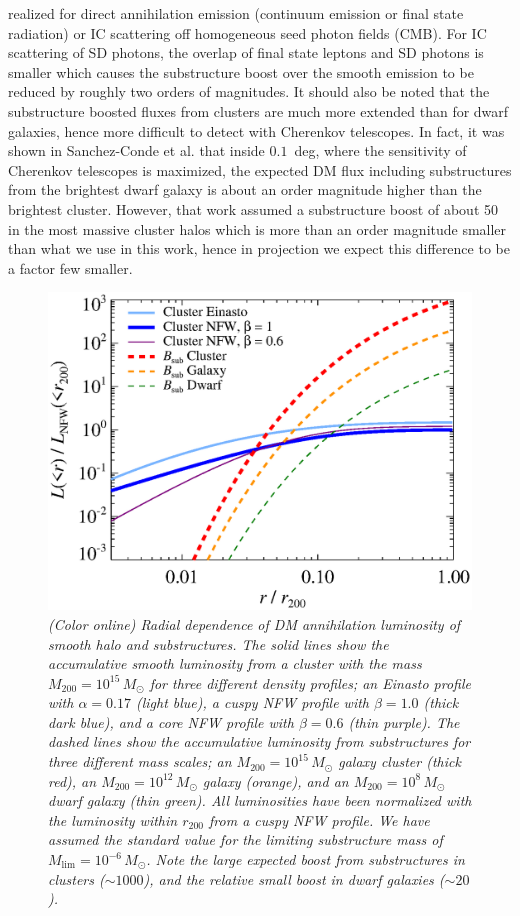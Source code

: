 \documentclass[10pt,aps,pra,reprint,amsmath,amsfonts,amssymb,showpacs,nofootinbib,floatfix]{revtex4-1}
\newcommand{\rmn}{\mathrm}
\newcommand{\msun}{M_\odot}
\newcommand{\rvir}{r_{200}}
\newcommand{\mvir}{M_{200}}
\begin{document}
realized for direct annihilation emission (continuum emission or final
state radiation) or IC scattering off homogeneous seed photon fields
(CMB). For IC scattering of SD photons, the overlap of final state
leptons and SD photons is smaller which causes the substructure boost
over the smooth emission to be reduced by roughly two orders of
magnitudes. It should also be noted that the substructure boosted
fluxes from clusters are much more extended than for dwarf galaxies,
hence more difficult to detect with Cherenkov telescopes. In fact, it
was shown in Sanchez-Conde et al. \cite{2011arXiv1104.3530S} that
inside $0.1$~deg, where the sensitivity of Cherenkov telescopes is
maximized, the expected DM flux including substructures from the
brightest dwarf galaxy is about an order magnitude higher than the
brightest cluster. However, that work assumed a substructure boost of
about 50 in the most massive cluster halos which is more than an order
magnitude smaller than what we use in this work, hence in projection
we expect this difference to be a factor few smaller.

\begin{figure}%
 \includegraphics[width=0.99\columnwidth]{figures/dens.prof.bw.eps}
 \caption{\it (Color online) Radial dependence of DM annihilation
   luminosity of smooth halo and substructures. The solid lines show
   the accumulative smooth luminosity from a cluster with the mass
   $\mvir=10^{15}\,\msun$ for three different density profiles; an
   Einasto profile with $\alpha=0.17$ (light blue), a cuspy NFW
   profile with $\beta=1.0$ (thick dark blue), and a core NFW profile
   with $\beta=0.6$ (thin purple). The dashed lines show the
   accumulative luminosity from substructures for three different mass
   scales; an $\mvir=10^{15}\,\msun$ galaxy cluster (thick red), an
   $\mvir=10^{12}\,\msun$ galaxy (orange), and an
   $\mvir=10^{8}\,\msun$ dwarf galaxy (thin green). All luminosities
   have been normalized with the luminosity within $\rvir$ from a
   cuspy NFW profile. We have assumed the standard value for the
   limiting substructure mass of $M_\rmn{lim}=10^{-6}\,\msun$. Note
   the large expected boost from substructures in clusters
   ($\sim1000$), and the relative small boost in dwarf galaxies
   ($\sim20$).}
 \label{fig:radial_lum}
\end{figure}
\end{document}
